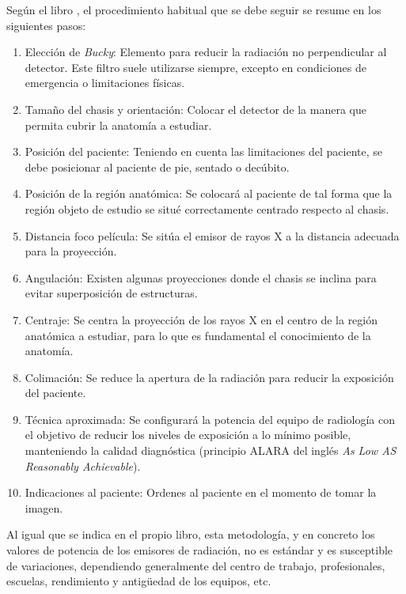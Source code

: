 Según el libro \cite{manualpractico}, el procedimiento habitual que se debe seguir se resume en los siguientes pasos:
\begin{enumerate}
    \item Elección de \emph{Bucky}: Elemento para reducir la radiación no perpendicular al detector. Este filtro suele utilizarse siempre, excepto en condiciones de emergencia o limitaciones físicas.
    \item Tamaño del chasis y orientación: Colocar el detector de la manera que permita cubrir la anatomía a estudiar.
    \item Posición del paciente: Teniendo en cuenta las limitaciones del paciente, se debe posicionar al paciente de pie, sentado o decúbito.
    \item Posición de la región anatómica: 
    Se colocará al paciente de tal forma que la región objeto de estudio se situé correctamente centrado respecto al chasis.
    \item Distancia foco película: Se sitúa el emisor de rayos X a la distancia adecuada para la proyección.
    \item Angulación: Existen algunas proyecciones donde el chasis se inclina para evitar superposición de estructuras.
    \item Centraje: Se centra la proyección de los rayos X en el centro de la región anatómica a estudiar, para lo que es fundamental el conocimiento de la anatomía.
    \item Colimación: Se reduce la apertura de la radiación para reducir la exposición del paciente.
    \item Técnica aproximada: Se configurará la potencia del equipo de radiología con el objetivo de reducir los niveles de exposición a lo mínimo posible, manteniendo la calidad diagnóstica (principio ALARA del inglés \emph{As Low AS Reasonably Achievable}\cite{manualpractico}). 
    \item Indicaciones al paciente: Ordenes al paciente en el momento de tomar la imagen.
\end{enumerate}
Al igual que se indica en el propio libro, esta metodología, y en concreto los valores de potencia de los emisores de radiación, no es estándar y es susceptible de variaciones, dependiendo generalmente del centro de trabajo, profesionales, escuelas, rendimiento y antigüedad de los equipos, etc. 




